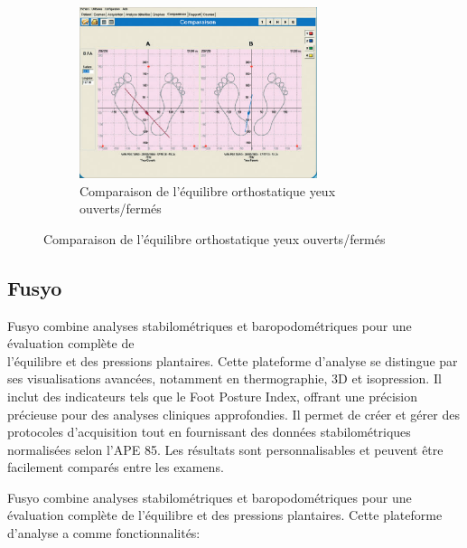 \begin{figure}[H]
\begin{subfigure}[b]{0.5\textwidth}
        \centering
        \includegraphics[height=5cm]{images/analyse_marche/comparaison_yo_yf.png}
        \caption{Comparaison de l'équilibre orthostatique yeux ouverts/fermés}\label{fig:winposture_comparaison_yo_yf}
    \end{subfigure}
\end{figure}

\subsection{Fusyo}

Fusyo combine analyses stabilométriques et baropodométriques pour une évaluation complète de \\ l'équilibre et des pressions plantaires. 
Cette plateforme d'analyse se distingue par ses visualisations avancées, notamment en thermographie, 3D et isopression. 
Il inclut des indicateurs tels que le Foot Posture Index, offrant une précision précieuse pour des analyses cliniques approfondies. 
Il permet de créer et gérer des protocoles d'acquisition tout en fournissant des données stabilométriques normalisées selon l'APE 85. 
Les résultats sont personnalisables et peuvent être facilement comparés entre les examens.

Fusyo combine analyses stabilométriques et baropodométriques pour une évaluation complète 
de l’équilibre et des pressions plantaires. 
Cette plateforme d’analyse a comme fonctionnalités:

